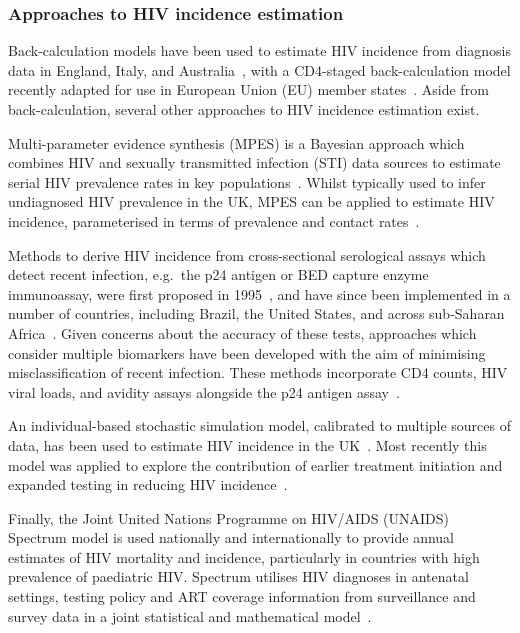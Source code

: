 \subsubsection{Approaches to HIV incidence estimation}

Back-calculation models have been used to estimate HIV incidence from diagnosis data in England, Italy, and Australia~\parencite{Bellocco2000-wk, Cui2000-ma, Aalen1997-jh}, with a CD4-staged back-calculation model recently adapted for use in European Union (EU) member states~\parencite{Regine2018-rm, van-Sighem2015-zo, van-Sighem2017-ye}. Aside from back-calculation, several other approaches to HIV incidence estimation exist.

Multi-parameter evidence synthesis (MPES) is a Bayesian approach which combines HIV and sexually transmitted infection (STI) data sources to estimate serial HIV prevalence rates in key populations~\parencite{Goubar2008-dd, Presanis2021-pv}. Whilst typically used to infer undiagnosed HIV prevalence in the UK, MPES can be applied to estimate HIV incidence, parameterised in terms of prevalence and contact rates~\parencite{Presanis2011-uy}.

Methods to derive HIV incidence from cross-sectional serological assays which detect recent infection, e.g.\ the p24 antigen or BED capture enzyme immunoassay, were first proposed in 1995~\parencite{Brookmeyer1995-ws}, and have since been implemented in a number of countries, including Brazil, the United States, and across sub-Saharan Africa~\parencite{Hall2008-ze, Le-Vu2008-up, Karita2007-sd}. Given concerns about the accuracy of these tests, approaches which consider multiple biomarkers have been developed with the aim of minimising misclassification of recent infection. These methods incorporate CD4 counts, HIV viral loads, and avidity assays alongside the p24 antigen assay~\parencite{Brookmeyer2013-mf, Sun2020-lt}.

An individual-based stochastic simulation model, calibrated to multiple sources of data, has been used to estimate HIV incidence in the UK~\parencite{Phillips2015-jc}. Most recently this model was applied to explore the contribution of earlier treatment initiation and expanded testing in reducing HIV incidence~\parencite{Cambiano2023-lj}.

Finally, the Joint United Nations Programme on HIV/AIDS (UNAIDS) Spectrum model is used nationally and internationally to provide annual estimates of HIV mortality and incidence, particularly in countries with high prevalence of paediatric HIV\@. Spectrum utilises HIV diagnoses in antenatal settings, testing policy and ART coverage information from surveillance and survey data in a joint statistical and mathematical model~\parencite{Stover2019-zm}.

